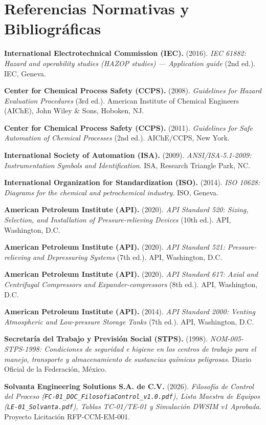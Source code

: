 \documentclass[10pt,letterpaper]{article}
\begin{document}
\section{Referencias Normativas y Bibliográficas}
\small
\begin{enumerate}[label={[\arabic*]}]
    \item \textbf{International Electrotechnical Commission (IEC).} (2016). \textit{IEC 61882: Hazard and operability studies (HAZOP studies) --- Application guide} (2nd ed.). IEC, Geneva.
    \item \textbf{Center for Chemical Process Safety (CCPS).} (2008). \textit{Guidelines for Hazard Evaluation Procedures} (3rd ed.). American Institute of Chemical Engineers (AIChE), John Wiley \& Sons, Hoboken, NJ.
    \item \textbf{Center for Chemical Process Safety (CCPS).} (2011). \textit{Guidelines for Safe Automation of Chemical Processes} (2nd ed.). AIChE/CCPS, New York.
    \item \textbf{International Society of Automation (ISA).} (2009). \textit{ANSI/ISA-5.1-2009: Instrumentation Symbols and Identification}. ISA, Research Triangle Park, NC.
    \item \textbf{International Organization for Standardization (ISO).} (2014). \textit{ISO 10628: Diagrams for the chemical and petrochemical industry}. ISO, Geneva.
    \item \textbf{American Petroleum Institute (API).} (2020). \textit{API Standard 520: Sizing, Selection, and Installation of Pressure-relieving Devices} (10th ed.). API, Washington, D.C.
    \item \textbf{American Petroleum Institute (API).} (2020). \textit{API Standard 521: Pressure-relieving and Depressuring Systems} (7th ed.). API, Washington, D.C.
    \item \textbf{American Petroleum Institute (API).} (2020). \textit{API Standard 617: Axial and Centrifugal Compressors and Expander-compressors} (8th ed.). API, Washington, D.C.
    \item \textbf{American Petroleum Institute (API).} (2014). \textit{API Standard 2000: Venting Atmospheric and Low-pressure Storage Tanks} (7th ed.). API, Washington, D.C.
    \item \textbf{Secretaría del Trabajo y Previsión Social (STPS).} (1998). \textit{NOM-005-STPS-1998: Condiciones de seguridad e higiene en los centros de trabajo para el manejo, transporte y almacenamiento de sustancias químicas peligrosas}. Diario Oficial de la Federación, México.
    \item \textbf{Solvanta Engineering Solutions S.A. de C.V.} (2026). \textit{Filosofía de Control del Proceso (\texttt{FC-01\_DOC\_FilosofiaControl\_v1.0.pdf}), Lista Maestra de Equipos (\texttt{LE-01\_Solvanta.pdf}), Tablas TC-01/TE-01 y Simulación DWSIM v1 Aprobada}. Proyecto Licitación RFP-CCM-EM-001.
\end{enumerate}
\newpage
\end{document}
